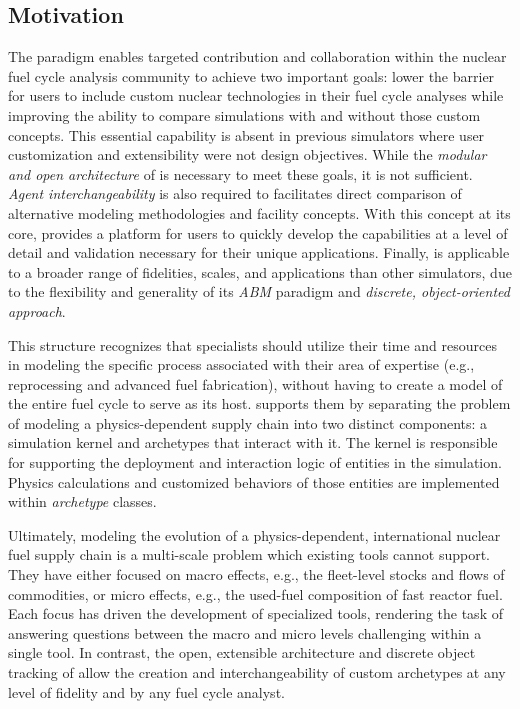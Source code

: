 \subsection{Motivation}

The \Cyclus paradigm enables targeted contribution and collaboration within the
nuclear fuel cycle analysis community to achieve two important goals: lower the
barrier for users to include custom nuclear technologies in their fuel cycle
analyses while improving the ability to compare simulations with and without
those custom concepts.  This essential capability is absent in
previous simulators where user customization and extensibility were not design
objectives.  While the \emph{modular and open architecture} of
\Cyclus is necessary to meet these goals, it is not sufficient.
\emph{Agent interchangeability} is also required to facilitates direct comparison
of alternative modeling methodologies and facility concepts. With this concept
at its core, \Cyclus provides a platform for users to quickly develop the
capabilities at a level of detail and validation necessary for their
unique applications.  Finally, \Cyclus is applicable to a broader range of
fidelities, scales, and applications than other simulators, due to the
flexibility and generality of its \emph{\gls{ABM}} paradigm and \emph{discrete,
object-oriented approach}.

This structure recognizes that specialists should utilize their time and
resources in modeling the specific process associated with their area of
expertise (e.g., reprocessing and advanced fuel fabrication), without having to
create a model of the entire fuel cycle to serve as its host.  \Cyclus supports
them by separating the problem of modeling a physics-dependent supply chain into
two distinct components: a simulation kernel and archetypes that interact with
it. The kernel is responsible for supporting the deployment and
interaction logic of entities in the simulation.  Physics calculations and
customized behaviors of those entities are implemented within \emph{archetype}
classes.

Ultimately, modeling the evolution of a physics-dependent, international
nuclear fuel supply chain is a multi-scale problem which existing tools cannot
support. They have either focused on macro effects, e.g., the fleet-level
stocks and flows of commodities, or micro effects, e.g., the used-fuel
composition of fast reactor fuel. Each focus has driven the development of
specialized tools, rendering the task of answering questions between the macro
and micro levels challenging within a single tool.  In contrast, the open, extensible
architecture and discrete object tracking of \Cyclus allow the creation and
interchangeability of custom archetypes at any level of fidelity and by any
fuel cycle analyst.




